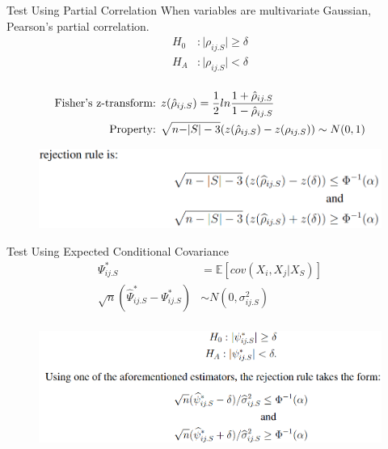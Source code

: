 \documentclass{beamer}
\begin{document}
\begin{frame}{Test Using Partial Correlation}
	\center When variables are multivariate Gaussian, Pearson's partial correlation.
	\vspace{1em}
	\begin{equation*}
		\begin{split}
			H_0&: \rvert \rho_{ij.S} \rvert \ge \delta \\
			H_A&: \rvert \rho_{ij.S} \rvert < \delta \\
		\end{split}
	\end{equation*}

	\begin{equation*}
		\begin{split}
			\textnormal{Fisher's z-transform: }& z(\hat{\rho}_{ij.S}) = \frac{1}{2} ln \frac{1+\hat{\rho}_{ij.S}}{1 - \hat{\rho}_{ij.S}} \\
			\textnormal{Property: }& \sqrt{n - \rvert S \rvert - 3}(z(\hat{\rho}_{ij.S}) - z(\rho_{ij.S})) \sim N(0, 1) \\
		\end{split}
	\end{equation*}
	\begin{figure}
		\centering
		\includegraphics[scale=0.3]{imgs/partial.png}
	\end{figure}
\end{frame}

\begin{frame}{Test Using Expected Conditional Covariance}
	\begin{equation*}
		\begin{split}
			\Psi^*_{ij.S} &= \mathbb{E}[cov(X_i, X_j | X_S)] \\
			\sqrt{n}(\hat{\Psi}^*_{ij.S} - \Psi^*_{ij.S}) & \sim N(0, \sigma^2_{ij.S}) \\
		\end{split}
	\end{equation*}
	\begin{figure}
		\centering
		\includegraphics[scale=0.3]{imgs/test2.png}
	\end{figure}
\end{frame}
\end{document}
